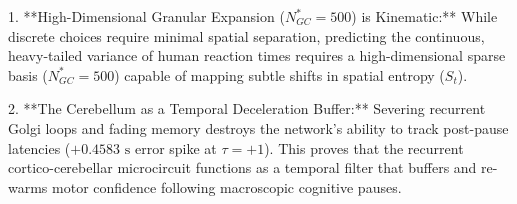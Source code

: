 \documentclass[11pt,twoside,a4paper]{article}
\begin{document}
1. **High-Dimensional Granular Expansion ($N_{GC}^* = 500$) is Kinematic:**
   While discrete choices require minimal spatial separation, predicting the continuous, heavy-tailed variance of human reaction times requires a high-dimensional sparse basis ($N_{GC}^* = 500$) capable of mapping subtle shifts in spatial entropy ($S_t$).
   
2. **The Cerebellum as a Temporal Deceleration Buffer:**
   Severing recurrent Golgi loops and fading memory destroys the network's ability to track post-pause latencies ($+0.4583\text{ s}$ error spike at $\tau = +1$). This proves that the recurrent cortico-cerebellar microcircuit functions as a temporal filter that buffers and re-warms motor confidence following macroscopic cognitive pauses.
\end{document}
